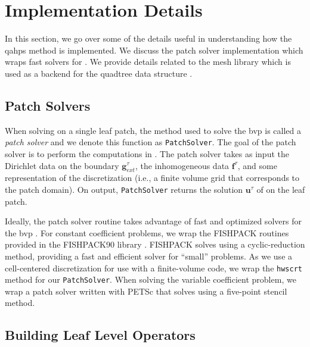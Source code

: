 \section{Implementation Details}
\label{sec:adaptivity}

In this section, we go over some of the details useful in understanding how the \gls{qahps} method is implemented. We discuss the patch solver implementation which wraps fast solvers for . We provide details related to the mesh library \pforest which is used as a backend for the quadtree data structure \citep{burstedde2011p4est}.

\subsection{Patch Solvers}
\label{sub:patch_solvers}

When solving  on a single leaf patch, the method used to solve the \gls{bvp} is called a {\em patch solver} and we denote this function as \texttt{PatchSolver}. The goal of the patch solver is to perform the computations in . The patch solver takes as input the Dirichlet data on the boundary $\textbf{g}_{ext}^{\tau}$, the inhomogeneous data $\textbf{f}^{\tau}$, and some representation of the discretization (i.e., a finite volume grid that corresponds to the patch domain). On output, \texttt{PatchSolver} returns the solution $\textbf{u}^{\tau}$ of  on the leaf patch.

Ideally, the patch solver routine takes advantage of fast and optimized solvers for the \gls{bvp} . For constant coefficient problems, we wrap the FISHPACK routines \citep{swarztrauber1999fishpack} provided in the FISHPACK90 library \citep{adams2016fishpack90}. FISHPACK solves  using a cyclic-reduction method, providing a fast and efficient solver for ``small'' problems. As we use a cell-centered discretization for use with a finite-volume code, we wrap the \texttt{hwscrt} method for our \texttt{PatchSolver}. When solving the variable coefficient problem, we wrap a patch solver written with PETSc \citep{anl2023petsc} that solves  using a five-point stencil method.

\subsection{Building Leaf Level Operators}
\label{sub:building-leaf-level-operators}

